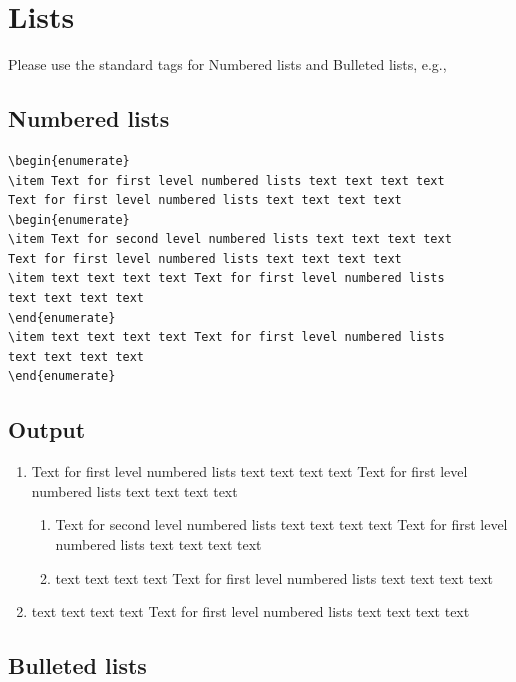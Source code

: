 \documentclass[]{Liebert_Author}
\begin{document}
\section{Lists}

Please use the standard tags for Numbered lists and Bulleted lists, e.g.,

\subsection*{Numbered lists}

\begin{verbatim}
\begin{enumerate}
\item Text for first level numbered lists text text text text
Text for first level numbered lists text text text text 
\begin{enumerate}
\item Text for second level numbered lists text text text text
Text for first level numbered lists text text text text 
\item text text text text Text for first level numbered lists
text text text text 
\end{enumerate}
\item text text text text Text for first level numbered lists
text text text text 
\end{enumerate}
\end{verbatim}

\subsection*{Output}

\begin{enumerate}
\item Text for first level numbered lists text text text text Text for first level numbered lists text text text text 
\begin{enumerate}
\item Text for second level numbered lists text text text text Text for first level numbered lists text text text text 
\item text text text text Text for first level numbered lists text text text text 
\end{enumerate}
\item text text text text Text for first level numbered lists text text text text 
\end{enumerate}

\subsection*{Bulleted lists}
\end{document}
